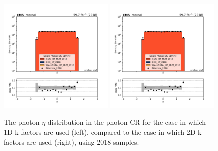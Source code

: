 \begin{figure}
    \begin{center}
        \includegraphics[width=0.49\textwidth]{fig/datamc/cr_g_vbf/cr_g_vbf_photon_eta0_losf_2018.pdf}
        \includegraphics[width=0.49\textwidth]{fig/datamc_2dkfac/cr_g_vbf/cr_g_vbf_photon_eta0_losf_2018.pdf} 
        \caption{The photon $\eta$ distribution in the photon CR for the case in which 1D k-factors are used (left), 
        compared to the case in which 2D k-factors are used (right), using 2018 samples.}
        \label{fig:photon_eta_2018}
    \end{center}
\end{figure}